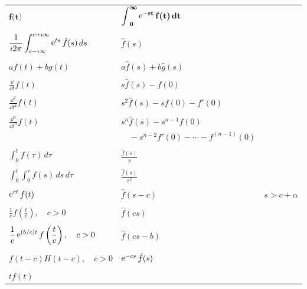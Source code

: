 \setlongtables
\begin{longtable}{lll}
  $\displaystyle \mathbf{f \boldsymbol{(} t \boldsymbol{)}}$
  & $\displaystyle \mathbf{\boldsymbol{\int}_0^{\boldsymbol{\infty}} \mathop{\mathrm{e}}\nolimits^{-s t}f \boldsymbol{(} t \boldsymbol{)} \,dt}$ 
  & \\
  \\
  $\displaystyle \frac{1}{\imath 2 \pi} 
  \int_{c - \imath \infty}^{c + \imath \infty} \mathop{\mathrm{e}}\nolimits^{t s} \hat{f}(s)\,d s$
  & $\displaystyle \hat{f}(s)$ 
  & \\
  \\
  $\displaystyle a f(t) + b g(t)$
  & $\displaystyle a \hat{f}(s) + b \hat{g}(s)$ 
  & \\
  \\
  $\displaystyle \frac{\dd}{\dd t} f(t)$
  & $\displaystyle s \hat{f}(s) - f(0)$
  & \\
  \\
  $\displaystyle \frac{\dd^2}{\dd t^2} f(t)$
  & $\displaystyle s^2 \hat{f}(s) - s f(0) - f'(0)$
  & \\
  \\
  $\displaystyle \frac{\dd^n}{\dd t^n} f(t)$
  & $\displaystyle s^n \hat{f}(s) - s^{n-1} f(0)$
  & \\
  & $\quad - s^{n-2} f'(0) - \cdots - f^{(n-1)}(0)$
  & \\
  \\
  $\displaystyle \int_0^t f(\tau)\,d\tau$
  & $\displaystyle \frac{\hat{f}(s)}{s}$
  & \\
  \\
  $\displaystyle \int_0^t \int_0^\tau f(s)\,ds\,d\tau$
  & $\displaystyle \frac{\hat{f}(s)}{s^2}$
  & \\
  \\
  $\displaystyle \mathop{\mathrm{e}}\nolimits^{c t} f(t)$
  & $\displaystyle \hat{f}(s - c)$
  & $s > c + \alpha$ \\
  \\
  $\displaystyle \frac{1}{c} f \left( \frac{t}{c} \right), \quad c > 0$
  & $\displaystyle \hat{f}(c s)$
  & \\
  \\
  $\displaystyle \frac{1}{c} \mathop{\mathrm{e}}\nolimits^{(b / c) t} f \left( \frac{t}{c} \right),\quad c > 0$
  & $\displaystyle \hat{f}(c s - b)$
  & \\
  \\
  $\displaystyle f(t - c) H(t - c), \quad c > 0$
  & $\displaystyle \mathop{\mathrm{e}}\nolimits^{- c s} \hat{f}(s)$
  & \\ %
  \\
  $\displaystyle t f(t)$

\end{longtable}
